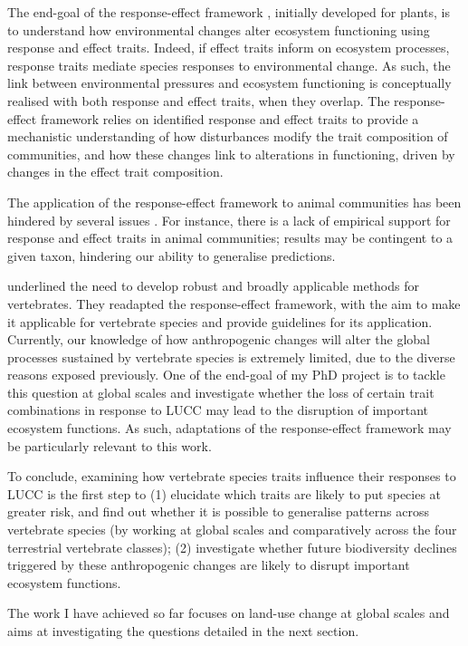 The end-goal of the response-effect framework \citep{Lavorel2002, Naeem2003,McGill2006}, initially developed for plants, is to understand how environmental changes alter ecosystem functioning using response and effect traits. Indeed, if effect traits inform on ecosystem processes, response traits mediate species responses to environmental change. As such, the link between environmental pressures and ecosystem functioning is conceptually realised with both response and effect traits, when they overlap. The response-effect framework relies on identified response and effect traits to provide a mechanistic understanding of how disturbances modify the trait composition of communities, and how these changes link to alterations in functioning, driven by changes in the effect trait composition. 

The application of the response-effect framework to animal communities has been hindered by several issues \citep{Luck2012, Bartomeus2018, Didham2016}. For instance, there is a lack of empirical support for response and effect traits in animal communities; results may be contingent to a given taxon, hindering our ability to generalise predictions. 

\citet{Luck2012} underlined the need to develop robust and broadly applicable methods for vertebrates. They readapted the response-effect framework, with the aim to make it applicable for vertebrate species and provide guidelines for its application. Currently, our knowledge of how anthropogenic changes will alter the global processes sustained by vertebrate species is extremely limited, due to the diverse reasons exposed previously. One of the end-goal of my PhD project is to tackle this question at global scales and investigate whether the loss of certain trait combinations in response to LUCC may lead to the disruption of important ecosystem functions. As such, adaptations of the response-effect framework may be particularly relevant to this work.

To conclude, examining how vertebrate species traits influence their responses to LUCC is the first step to (1) elucidate which traits are likely to put species at greater risk, and find out whether it is possible to generalise patterns across vertebrate species  (by working at global scales and comparatively across the four terrestrial vertebrate classes); (2) investigate whether future biodiversity declines triggered by these anthropogenic changes are likely to disrupt important ecosystem functions. 

The work I have achieved so far focuses on land-use change at global scales and aims at investigating the questions detailed in the next section.


